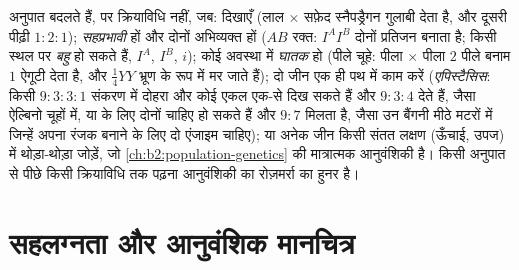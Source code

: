 \begin{proposition}[सरल अनुपातों से आगे]\label{prop:b2:meiosis-heredity:extensions}
अनुपात बदलते हैं, पर क्रियाविधि नहीं, जब: 
\emph{} दिखाएँ (लाल $\times$ सफ़ेद स्नैपड्रैगन
गुलाबी देता है, और दूसरी पीढ़ी $1 : 2 : 1$); 
\emph{सहप्रभावी} हों और दोनों अभिव्यक्त हों ($AB$ रक्त: 
$I^AI^B$ दोनों प्रतिजन बनाता है; किसी स्थल पर \emph{बहु
} हो सकते हैं, $I^A$, $I^B$, $i$); कोई 
 अवस्था में \emph{घातक} हो (पीले चूहे: पीला $\times$ पीला $2$ पीले
बनाम $1$ ऐगूटी देता है, और $\tfrac14 YY$ भ्रूण के रूप में मर जाते हैं);
दो जीन एक ही पथ में काम करें (\emph{एपिस्टैसिस}: किसी $9 : 3 : 3 : 1$
संकरण में दोहरा  और कोई एकल  एक-से दिख सकते हैं और
$9 : 3 : 4$ देते हैं, जैसा ऐल्बिनो चूहों में, या  के लिए
दोनों  चाहिए हो सकते हैं और $9 : 7$ मिलता है, जैसा उन बैंगनी
मीठे मटरों में जिन्हें अपना रंजक बनाने के लिए दो एंजाइम चाहिए); या अनेक
जीन किसी संतत लक्षण (ऊँचाई, उपज) में थोड़ा-थोड़ा जोड़ें, जो
\cref{ch:b2:population-genetics} की मात्रात्मक आनुवंशिकी है। किसी
अनुपात से पीछे किसी क्रियाविधि तक पढ़ना आनुवंशिकी का रोज़मर्रा का हुनर है।
\end{proposition}

\section{सहलग्नता और आनुवंशिक मानचित्र}


